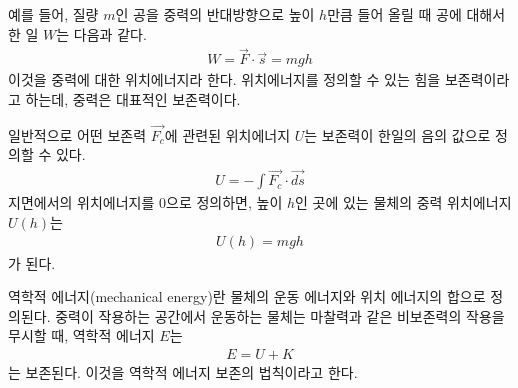 \documentclass[12pt,a4paper]{article}
\begin{document}
예를 들어, 질량 $m$인 공을 중력의 반대방향으로 높이 $h$만큼 들어 올릴 때 공에 대해서
한 일 $W$는 다음과 같다.
\begin{equation}
    \begin{aligned}
        W = \vec{F} \cdot \vec{s} = mgh
        \label{eq9}
    \end{aligned}
\end{equation}
이것을 중력에 대한 위치에너지라 한다. 위치에너지를 정의할 수 있는 힘을 보존력이라고
하는데, 중력은 대표적인 보존력이다.

일반적으로 어떤 보존력 $\vec{F_c}$에 관련된 위치에너지 $U$는 보존력이 한일의 음의
값으로 정의할 수 있다.
\begin{equation}
    \begin{aligned}
        U = -\int\vec{F_c}\cdot\vec{ds}
        \label{eq10}
    \end{aligned}
\end{equation}
지면에서의 위치에너지를 0으로 정의하면, 높이 $h$인 곳에 있는 물체의 중력 위치에너지
$U(h)$는
\begin{equation}
    \begin{aligned}
        U(h)=mgh
        \label{eq11}
    \end{aligned}
\end{equation}
가 된다.

역학적 에너지(mechanical energy)란 물체의 운동 에너지와 위치 에너지의 합으로
정의된다. 중력이 작용하는 공간에서 운동하는 물체는 마찰력과 같은 비보존력의 작용을
무시할 때, 역학적 에너지 $E$는
\begin{equation}
    \begin{aligned}
        E=U+K
        \label{eq12}
    \end{aligned}
\end{equation}
는 보존된다. 이것을 역학적 에너지 보존의 법칙이라고 한다.
\end{document}
